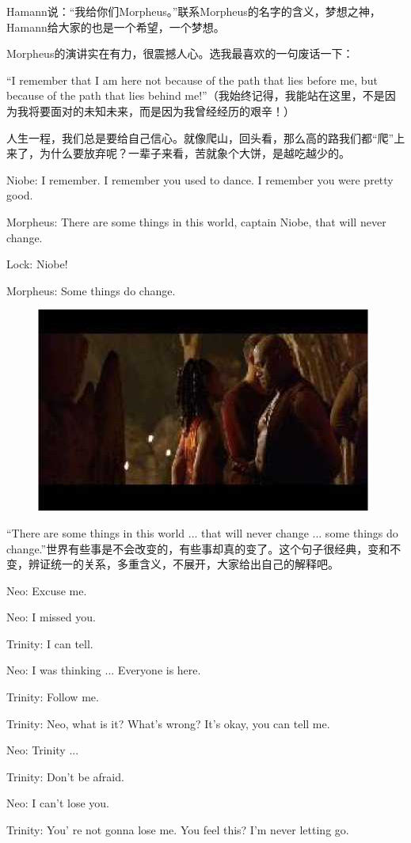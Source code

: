 \documentclass[UTF8]{ctexart}
\newenvironment{myquote}{\color{green} \setlength{\leftskip}{6em} \setlength{\rightskip}{4em} \setlength{\parindent}{-2em}}{\par}
\begin{document}
Hamann说：“我给你们Morpheus。”联系Morpheus的名字的含义，梦想之神，Hamann给大家的也是一个希望，一个梦想。

Morpheus的演讲实在有力，很震撼人心。选我最喜欢的一句废话一下：

“I remember that I am here not because of the path that lies before me, but because of the path that lies behind me!”（我始终记得，我能站在这里，不是因为我将要面对的未知未来，而是因为我曾经经历的艰辛！）

人生一程，我们总是要给自己信心。就像爬山，回头看，那么高的路我们都“爬”上来了，为什么要放弃呢？一辈子来看，苦就象个大饼，是越吃越少的。

\begin{myquote}
Niobe: I remember. I remember you used to dance. I remember you were pretty good.

Morpheus: There are some things in this world, captain Niobe, that will never change.

Lock: Niobe!

Morpheus: Some things do change.
\end{myquote}

\begin{figure}[htb]
\centering
\includegraphics[width=0.5\linewidth]{fig/read_reloaded-42}
\end{figure}

“There are some things in this world ... that will never change ... some things do change.”世界有些事是不会改变的，有些事却真的变了。这个句子很经典，变和不变，辨证统一的关系，多重含义，不展开，大家给出自己的解释吧。

\begin{myquote}
Neo: Excuse me.

Neo: I missed you.

Trinity: I can tell.

Neo: I was thinking ... Everyone is here.

Trinity: Follow me.

Trinity: Neo, what is it? What's wrong? It's okay, you can tell me.

Neo: Trinity ...

Trinity: Don't be afraid.

Neo: I can't lose you.

Trinity: You' re not gonna lose me. You feel this? I'm never letting go.
\end{myquote}
\end{document}
